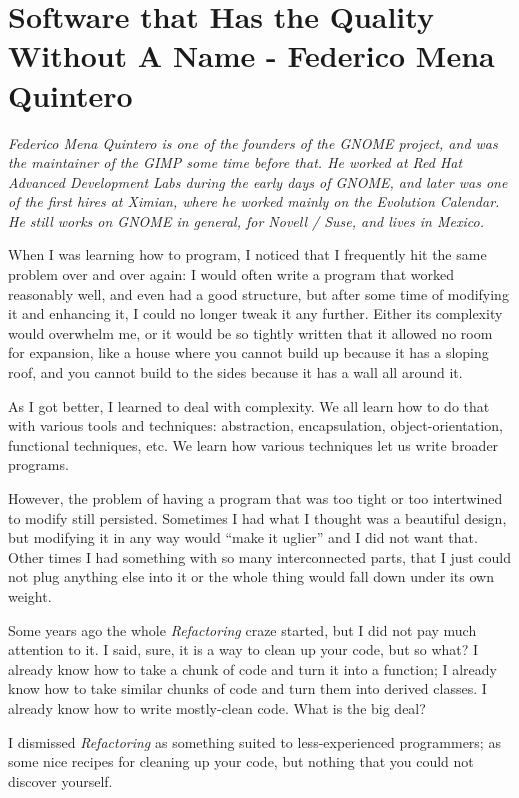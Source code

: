 \chapter{Software that Has the Quality Without A Name - Federico Mena Quintero}
\textit{Federico Mena Quintero is one of the founders of the GNOME
  project, and was the maintainer of the GIMP some time before that.
  He worked at Red Hat Advanced Development Labs during the early days
  of GNOME, and later was one of the first hires at Ximian, where he
  worked mainly on the Evolution Calendar.  He still works on GNOME in
  general, for Novell / Suse, and lives in Mexico.}

When I was learning how to program, I noticed that I frequently hit the same
problem over and over again: I would often write a program that worked
reasonably well, and even had a good structure, but after some time of modifying
it and enhancing it, I could no longer tweak it any further. Either its
complexity would overwhelm me, or it would be so tightly written that it allowed
no room for expansion, like a house where you cannot build up because it has a
sloping roof, and you cannot build to the sides because it has a wall all around
it.

As I got better, I learned to deal with complexity. We all learn how to do that
with various tools and techniques: abstraction, encapsulation,
object-orientation, functional techniques, etc. We learn how various techniques
let us write broader programs.

However, the problem of having a program that was too tight or too intertwined
to modify still persisted. Sometimes I had what I thought was a beautiful
design, but modifying it in any way would ``make it uglier'' and I did not want
that. Other times I had something with so many interconnected parts, that I just
could not plug anything else into it or the whole thing would fall down under
its own weight.

Some years ago the whole \textit{Refactoring} craze started, but I did not pay
much attention to it. I said, sure, it is a way to clean up your code, but so
what? I already know how to take a chunk of code and turn it into a function; I
already know how to take similar chunks of code and turn them into derived
classes. I already know how to write mostly-clean code. What is the big deal?

I dismissed \textit{Refactoring} as something suited to less-experienced
programmers; as some nice recipes for cleaning up your code, but nothing that
you could not discover yourself.

